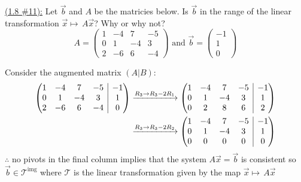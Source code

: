 \documentclass{exam}
\makeatletter
\newenvironment{amatrix}[1]{%
  \left(\begin{array}{@{}*{#1}{c}|c@{}}
}{%
  \end{array}\right)
}
\makeatother
\begin{document}
\underline{(1.8 \#11):} Let $\vec{b}$ and $A$ be the matricies below. Is $\vec{b}$ in the range of the linear transformation $\vec{x}\mapsto\,A\vec{x}$? Why or why not?
\[
    A = \begin{pmatrix}
        1 & -4 & 7 & -5 \\
        0 & 1 & -4 & 3 \\
        2 & -6 & 6 & -4
    \end{pmatrix}
    \text{ and }
    \vec{b} = \begin{pmatrix}
        -1 \\ 1 \\ 0
    \end{pmatrix}
\]
\begin{solution}
    Consider the augmented matrix $(A | B)$:
    \begin{align*}
        \begin{amatrix}{4}
        1 & -4 & 7 & -5 & -1 \\
        0 & 1 & -4 & 3 & 1 \\
        2 & -6 & 6 & -4 & 0
        \end{amatrix}
        &\xrightarrow{R_3 \to R_3 - 2R_1}
        \begin{amatrix}{4}
        1 & -4 & 7 & -5 & -1 \\
        0 & 1 & -4 & 3 & 1 \\
        0 & 2 & 8 & 6 & 2
        \end{amatrix}\\
        &\xrightarrow{R_3 \to R_3 - 2R_2}
        \begin{amatrix}{4}
        1 & -4 & 7 & -5 & -1 \\
        0 & 1 & -4 & 3 & 1 \\
        0 & 0 & 0 & 0 & 0
        \end{amatrix}
    \end{align*}
    $\therefore$ no pivots in the final column implies that the system $A\vec{x}=\vec{b}$ is consistent so $\vec{b} \in \mathcal{T}^{\text{img}}$ where $\mathcal{T}$ is the linear transformation given by the map $\vec{x}\mapsto\,A\vec{x}$
\end{solution}
\end{document}
